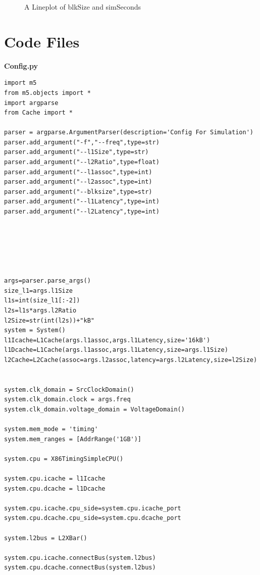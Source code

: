\documentclass[10pt,a4paper]{article}
\begin{document}
\begin{itemize}
\begin{figure}[h!]
\caption{A Lineplot of blkSize and simSeconds}
\end{figure}
\end{itemize}
\clearpage
\appendix

\section{Code Files}\label{appendix:Code Files}
\textbf{Config.py}
\begin{lstlisting}
import m5
from m5.objects import *
import argparse
from Cache import *

parser = argparse.ArgumentParser(description='Config For Simulation')
parser.add_argument("-f","--freq",type=str)
parser.add_argument("--l1Size",type=str)
parser.add_argument("--l2Ratio",type=float)
parser.add_argument("--l1assoc",type=int)
parser.add_argument("--l2assoc",type=int)
parser.add_argument("--blksize",type=str)
parser.add_argument("--l1Latency",type=int)
parser.add_argument("--l2Latency",type=int)






args=parser.parse_args()
size_l1=args.l1Size
l1s=int(size_l1[:-2])
l2s=l1s*args.l2Ratio
l2Size=str(int(l2s))+"kB"
system = System()
l1Icache=L1Cache(args.l1assoc,args.l1Latency,size='16kB')
l1Dcache=L1Cache(args.l1assoc,args.l1Latency,size=args.l1Size)
l2Cache=L2Cache(assoc=args.l2assoc,latency=args.l2Latency,size=l2Size)


system.clk_domain = SrcClockDomain()
system.clk_domain.clock = args.freq
system.clk_domain.voltage_domain = VoltageDomain()

system.mem_mode = 'timing'
system.mem_ranges = [AddrRange('1GB')]

system.cpu = X86TimingSimpleCPU()

system.cpu.icache = l1Icache
system.cpu.dcache = l1Dcache

system.cpu.icache.cpu_side=system.cpu.icache_port
system.cpu.dcache.cpu_side=system.cpu.dcache_port

system.l2bus = L2XBar()

system.cpu.icache.connectBus(system.l2bus)
system.cpu.dcache.connectBus(system.l2bus)


\end{lstlisting}
\end{document}
